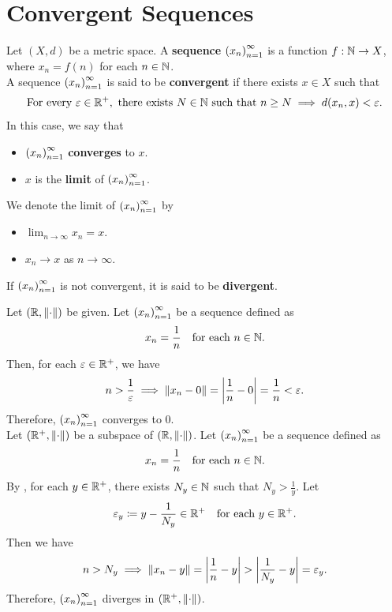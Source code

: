 \section{Convergent Sequences}

Let $(X, d)$ be a metric space. A \textbf{sequence} $\paren*{x_{n}}_{n = 1}^{\infty}$
is a function $f: \N \to X$, where $x_{n} = f(n)$ for each $n \in \N$.
\\[6mm]
A sequence $\paren*{x_{n}}_{n = 1}^{\infty}$ is said to be \textbf{convergent} if there exists $x \in X$ such that
\[
\text{For every } \veps \in \R^{+}, \text{ there exists } N \in \N \text{ such that } n \geq N \implies d(x_{n}, x) < \veps.
\]
In this case, we say that
\begin{itemize}
    \item $\paren*{x_{n}}_{n = 1}^{\infty}$ \textbf{converges} to $x$.
    \item $x$ is the \textbf{limit} of $\paren*{x_{n}}_{n = 1}^{\infty}$.
\end{itemize}
We denote the limit of $\paren*{x_{n}}_{n = 1}^{\infty}$ by
\begin{itemize}
    \item $\lim_{n \to \infty} x_{n} = x$.
    \item $x_{n} \to x$ as $n \to \infty$.
\end{itemize}
If $\paren*{x_{n}}_{n = 1}^{\infty}$ is not convergent, it is said to be \textbf{divergent}.

\bigskip

\begin{example}
    Let $\paren*{\R, \norm*{\cdot}}$ be given. Let $\paren*{x_{n}}_{n = 1}^{\infty}$ be a sequence defined as
    \[
    x_{n} = \frac{1}{n} \quad \text{for each } n \in \N.
    \]
    Then, for each $\veps \in \R^{+}$, we have
    \[
    n > \frac{1}{\veps} \implies \norm*{x_{n} - 0} = \abs*{\frac{1}{n} - 0} = \frac{1}{n} < \veps.
    \]
    Therefore, $\paren*{x_{n}}_{n = 1}^{\infty}$ converges to $0$.
    \\[6mm]
    Let $\paren*{\R^{+}, \norm*{\cdot}}$ be a subspace of $\paren*{\R, \norm*{\cdot}}$.
    Let $\paren*{x_{n}}_{n = 1}^{\infty}$ be a sequence defined as
    \[
    x_{n} = \frac{1}{n} \quad \text{for each } n \in \N.
    \]
    By , for each $y \in \R^{+}$, there exists $N_{y} \in \N$ such that $N_{y} >
    \frac{1}{y}$. Let
    \[
    \veps_{y} \coloneqq y - \frac{1}{N_{y}} \in \R^{+} \quad \text{for each } y \in \R^{+}.
    \]
    Then we have
    \[
    n > N_{y} \implies \norm*{x_{n} - y} = \abs*{\frac{1}{n} - y} > \abs*{\frac{1}{N_{y}} - y} = \veps_{y}.
    \]
    Therefore, $\paren*{x_{n}}_{n = 1}^{\infty}$ diverges in $\paren*{\R^{+}, \norm*{\cdot}}$.
\end{example}

